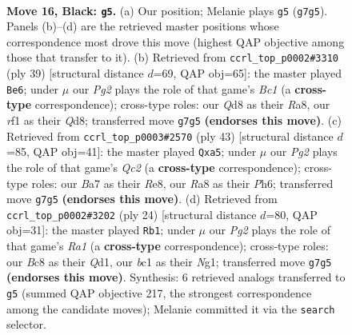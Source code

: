 \documentclass[11pt]{article}
\begin{document}
\clearpage

\begin{figure}[p]\centering
\begin{subfigure}{0.46\textwidth}\centering
\resizebox{\linewidth}{!}{%
\newchessgame
\chessboard[
  setfen={r1bq1r2/b1p2ppk/2p4p/P3p2Q/4P3/2PP4/5PP1/RNB2RK1 b - - 0 16},
  showmover=false,
  pgfstyle=straightmove, color=movearrow, markmove={g7-g5}
]}
\caption{}
\end{subfigure}\hfill
\begin{subfigure}{0.46\textwidth}\centering
\resizebox{\linewidth}{!}{%
\newchessgame
\chessboard[
  setfen={r1bqr1k1/2p2pp1/p6p/4P3/2Q5/2P4P/P4PP1/R1B1R1K1 b - - 0 20},
  showmover=false,
  pgfstyle=straightmove, color=movearrow, markmove={c8-e6}
]}
\caption{}
\end{subfigure}
\\[4pt]
\begin{subfigure}{0.46\textwidth}\centering
\resizebox{\linewidth}{!}{%
\newchessgame
\chessboard[
  setfen={1k1rr3/p1q2p2/2p4p/PpQbP3/5p1P/3P1P2/1PPN4/2K1R2R b - - 0 22},
  showmover=false,
  pgfstyle=straightmove, color=movearrow, markmove={c7-a5}
]}
\caption{}
\end{subfigure}\hfill
\begin{subfigure}{0.46\textwidth}\centering
\resizebox{\linewidth}{!}{%
\newchessgame
\chessboard[
  setfen={rnb2rk1/p4p1p/4p1p1/qBpP4/4P2P/2P5/P4PP1/R2QK1NR w KQ - 1 13},
  showmover=false,
  pgfstyle=straightmove, color=movearrow, markmove={a1-b1}
]}
\caption{}
\end{subfigure}
\caption{\textbf{Move 16, Black: \texttt{g5}.} (a) Our position; Melanie plays \texttt{g5} (\texttt{g7g5}). Panels (b)--(d) are the retrieved master positions whose correspondence most drove this move (highest QAP objective among those that transfer to it). (b) Retrieved from \texttt{ccrl\_top\_p0002\#3310} (ply 39) [structural distance $d$=69, QAP obj=65]: the master played \texttt{Be6}; under $\mu$ our \emph{Pg2} plays the role of that game's \emph{Bc1} (a \textbf{cross-type} correspondence); cross-type roles: our \emph{Q}d8 as their \emph{R}a8, our \emph{r}f1 as their \emph{Q}d8; transferred move \texttt{g7g5} \textbf{(endorses this move)}. (c) Retrieved from \texttt{ccrl\_top\_p0003\#2570} (ply 43) [structural distance $d$=85, QAP obj=41]: the master played \texttt{Qxa5}; under $\mu$ our \emph{Pg2} plays the role of that game's \emph{Qc2} (a \textbf{cross-type} correspondence); cross-type roles: our \emph{B}a7 as their \emph{R}e8, our \emph{R}a8 as their \emph{P}h6; transferred move \texttt{g7g5} \textbf{(endorses this move)}. (d) Retrieved from \texttt{ccrl\_top\_p0002\#3202} (ply 24) [structural distance $d$=80, QAP obj=31]: the master played \texttt{Rb1}; under $\mu$ our \emph{Pg2} plays the role of that game's \emph{Ra1} (a \textbf{cross-type} correspondence); cross-type roles: our \emph{B}c8 as their \emph{Q}d1, our \emph{b}c1 as their \emph{N}g1; transferred move \texttt{g7g5} \textbf{(endorses this move)}. Synthesis: 6 retrieved analogs transferred to \texttt{g5} (summed QAP objective 217, the strongest correspondence among the candidate moves); Melanie committed it via the \texttt{search} selector.}
\label{fig:thought-m31}
\end{figure}
\end{document}

